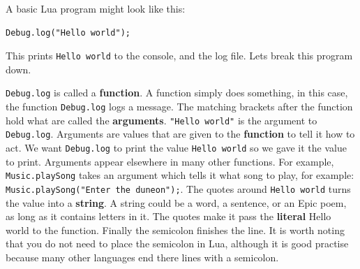 \documentclass{book}
\begin{document}
A basic Lua program might look like this:
\begin{verbatim}
Debug.log("Hello world");
\end{verbatim}

This prints \texttt{Hello world} to the console, and the log file. Lets break this program down.

\texttt{Debug.log} is called a \textbf{function}. A function simply does something, in this case, the function \texttt{Debug.log} logs a message. The matching brackets after the function hold what are called the \textbf{arguments}. \texttt{"Hello world"} is the argument to \texttt{Debug.log}. Arguments are values that are given to the \textbf{function} to tell it how to act. We want \texttt{Debug.log} to print the value \texttt{Hello world} so we gave it the value to print. Arguments appear elsewhere in many other functions. For example, \texttt{Music.playSong} takes an argument which tells it what song to play, for example: \texttt{Music.playSong("Enter the duneon");}. The quotes around \texttt{Hello world} turns the value into a \textbf{string}. A string could be a word, a sentence, or an Epic poem, as long as it contains letters in it. The quotes make it pass the \textbf{literal} Hello world to the function. Finally the semicolon finishes the line. It is worth noting that you do not need to place the semicolon in Lua, although it is good practise because many other languages end there lines with a semicolon.
\end{document}
